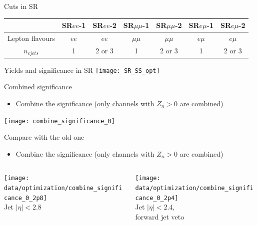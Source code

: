 \documentclass[mathserif,serif]{beamer}
\begin{document}
\begin{frame}{Cuts in SR}
\vspace{5mm}
\tiny
\begin{tabular}{|c|c|c|c|c|c|c|}
\hline
& SR$ee$-1 & SR$ee$-2 & SR$\mu\mu$-1 & SR$\mu\mu$-2 & SR$e\mu$-1 & SR$e\mu$-2 \\
\hline
Lepton flavours & $ee$ & $ee$ & $\mu\mu$ & $\mu\mu$ & $e\mu$ & $e\mu$ \\
\hline
$n_{cjets}$ & 1 & 2 or 3 & 1 & 2 or 3 & 1 & 2 or 3 \\
\hline

\end{tabular}
\end{frame}

\begin{frame}{Yields and significance in SR}
\texttt{[image: SR\_SS\_opt]}
\end{frame}




\begin{frame}{Combined significance}
\begin{itemize}
\item Combine the significance (only channels with $Z_n>0$ are combined)
\end{itemize}
\texttt{[image: combine\_significance\_0]}
\end{frame}

\begin{frame}{Compare with the old one}
\begin{itemize}
\item Combine the significance (only channels with $Z_n>0$ are combined)
\end{itemize}
\begin{columns}

\begin{column}{0.5\textwidth}
\begin{center}
\texttt{[image: data/optimization/combine\_significance\_0\_2p8]} \\
Jet $|\eta|<2.8$
\end{center}
\end{column}

\begin{column}{0.5\textwidth}
\begin{center}
\texttt{[image: data/optimization/combine\_significance\_0\_2p4]} \\
Jet $|\eta|<2.4$, \\ forward jet veto
\end{center}
\end{column}

\end{columns}
\end{frame}
\end{document}
